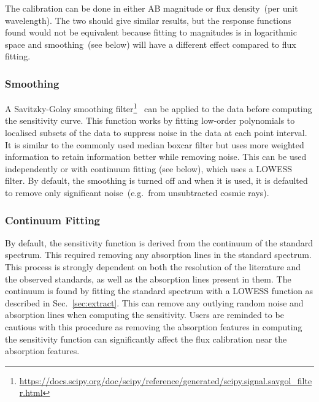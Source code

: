 \documentclass[linenumbers, twocolumn]{aastex631}
\begin{document}
The calibration can be done in either AB magnitude or
flux density~(per unit wavelength). The two should give similar
results, but the response functions found would not be equivalent
because fitting to magnitudes is in logarithmic space and smoothing~(see
below) will have a different effect compared to flux fitting.

\subsubsection*{Smoothing}
A Savitzky-Golay smoothing
filter\footnote{\url{https://docs.scipy.org/doc/scipy/reference/generated/scipy.signal.savgol_filter.html}}~\citep[hereafter, SG-filter]{1964AnaCh..36.1627S}
can be applied to the data before computing the sensitivity curve. This function
works by fitting low-order polynomials to localised subsets of the data to
suppress noise in the data at each point interval. It is similar to the
commonly used median boxcar filter but uses more weighted information to
retain information better while removing noise. This can be used independently
or with continuum fitting (see below), which uses a LOWESS filter. By default,
the smoothing is turned off and when it is used, it is defaulted to
remove only significant noise~(e.g.\ from unsubtracted cosmic rays).

\subsubsection*{Continuum Fitting}
By default, the sensitivity function is derived from the continuum of the standard spectrum. This required removing any absorption lines in the standard spectrum. This process is strongly dependent on both the
resolution of the literature and the observed standards, as well as the
absorption lines present in them. 
The continuum is found by fitting the standard
spectrum with a LOWESS function as described in Sec.~\ref{sec:extract}. This
can remove any outlying random noise and absorption lines when computing the 
sensitivity. Users are reminded to be cautious with this procedure as removing
the absorption features in computing the sensitivity function can significantly
affect the flux calibration near the absorption features.

\end{document}
